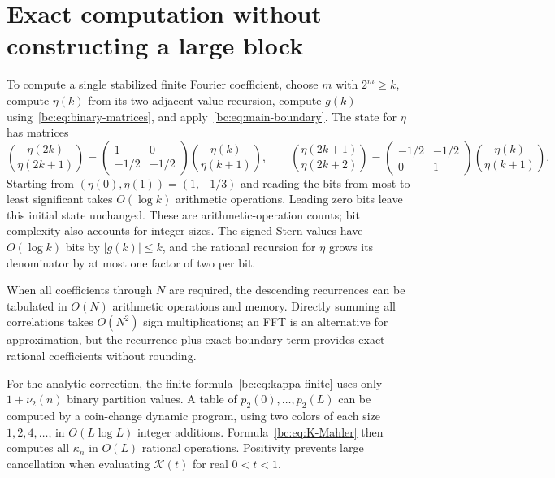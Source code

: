 \documentclass[11pt,a4paper,oneside,openany]{book}
\numberwithin{equation}{chapter}
\theoremstyle{definition}
\theoremstyle{remark}
\newcommand{\vnu}{\nu_2}
\begin{document}
\section{Exact computation without constructing a large block}
To compute a single stabilized finite Fourier coefficient, choose $m$ with
$2^m\ge k$, compute $\eta(k)$ from its two adjacent-value recursion, compute
$g(k)$ using~\eqref{bc:eq:binary-matrices}, and apply~\eqref{bc:eq:main-boundary}.
The state for $\eta$ has matrices
\begin{equation}
 \binom{\eta(2k)}{\eta(2k+1)}=
 \begin{pmatrix}1&0\\-1/2&-1/2\end{pmatrix}
 \binom{\eta(k)}{\eta(k+1)},\qquad
 \binom{\eta(2k+1)}{\eta(2k+2)}=
 \begin{pmatrix}-1/2&-1/2\\0&1\end{pmatrix}
 \binom{\eta(k)}{\eta(k+1)}.
 \label{bc:eq:eta-binary-matrices}
\end{equation}
Starting from $(\eta(0),\eta(1))=(1,-1/3)$ and reading the bits from most to
least significant takes $O(\log k)$ arithmetic operations. Leading zero bits
leave this initial state unchanged. These are arithmetic-operation counts;
bit complexity also accounts for integer sizes. The signed Stern values have
$O(\log k)$ bits by $|g(k)|\le k$, and the rational recursion for $\eta$ grows
its denominator by at most one factor of two per bit.

When all coefficients through $N$ are required, the descending recurrences can
be tabulated in $O(N)$ arithmetic operations and memory. Directly summing all
correlations takes $O(N^2)$ sign multiplications; an FFT is an alternative for
approximation, but the recurrence plus exact boundary term provides exact
rational coefficients without rounding.

For the analytic correction, the finite formula~\eqref{bc:eq:kappa-finite} uses only
$1+\vnu(n)$ binary partition values. A table of $p_2(0),\ldots,p_2(L)$ can be
computed by a coin-change dynamic program, using two colors of each size
$1,2,4,\ldots$, in $O(L\log L)$ integer additions. Formula~\eqref{bc:eq:K-Mahler}
then computes all $\kappa_n$ in $O(L)$ rational operations. Positivity prevents
large cancellation when evaluating $\mathcal K(t)$ for real $0<t<1$.
\end{document}
